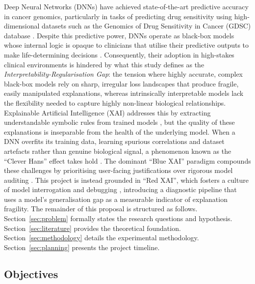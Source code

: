 \label{sec:introduction}

Deep Neural Networks (DNNs) have achieved state-of-the-art predictive accuracy in cancer
genomics, particularly in tasks of predicting drug sensitivity using high-dimensional datasets such
as the Genomics of Drug Sensitivity in Cancer (GDSC) database \cite{Yang2013,Baptista2021}.
Despite this predictive power, DNNs operate as black-box models whose internal logic is opaque
to clinicians that utilise their predictive outputs to make life-determining decisions \cite{Arrieta2020}.
Consequently, their adoption in high-stakes clinical environments is hindered \cite{Arrieta2020, Klauschen2024}
by what this study defines as the \textit{Interpretability-Regularisation Gap}: the tension where highly
accurate, complex black-box models rely on sharp, irregular loss landscapes that produce fragile,
easily manipulated explanations, whereas intrinsically interpretable models lack the flexibility
needed to capture highly non-linear biological relationships.
\noindent
Explainable Artificial Intelligence (XAI) addresses this by extracting understandable symbolic
rules from trained models \cite{Yedjour2024}, but the quality of these explanations is inseparable
from the health of the underlying model. When a DNN overfits its training data, learning spurious
correlations and dataset artefacts rather than genuine biological signal, a phenomenon known as
the ``Clever Hans'' effect takes hold \cite{Anders2022, Pahde2023, Samek2017}. The dominant
``Blue XAI'' paradigm compounds these challenges by prioritising user-facing justifications over
rigorous model auditing \cite{Biecek2024}. This project is instead grounded in ``Red XAI'', which
fosters a culture of model interrogation and debugging \cite{Biecek2024}, introducing a diagnostic
pipeline that uses a model's generalisation gap as a measurable indicator of explanation fragility.
\noindent
The remainder of this proposal is structured as follows. Section~\ref{sec:problem} formally states
the research questions and hypothesis. Section~\ref{sec:literature} provides the theoretical
foundation. Section~\ref{sec:methodology} details the experimental methodology.
Section~\ref{sec:planning} presents the project timeline.

\subsection*{Objectives}

